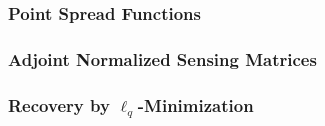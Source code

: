 \subsubsection{Point Spread Functions}


\subsubsection{Adjoint Normalized Sensing Matrices}


%

\subsubsection{Recovery by $\ell_{q}$-Minimization}

